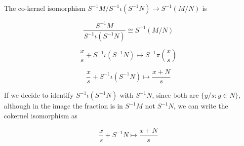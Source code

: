 \documentclass{article}
\begin{document}
The co-kernel isomorphism $S^{-1}M/S^{-1}\iota(S^{-1}N) \rightarrow S^{-1}(M/N)$ is

\[
\frac{S^{-1}M}{S^{-1}\iota(S^{-1}N)} \cong S^{-1}(M/N)
\]

\[
\frac{x}{s} + S^{-1}\iota(S^{-1}N) \mapsto S^{-1}\pi(\frac{x}{s})
\]

\[
\frac{x}{s} + S^{-1}\iota(S^{-1}N) \mapsto \frac{x + N}{s}
\]

If we decide to identify $S^{-1}\iota(S^{-1}N)$ with $S^{-1}N$, since both are $\{ y/s: y \in N \}$, although in the image the fraction is in $S^{-1}M$ not $S^{-1}N$, we can write the cokernel isomorphism as

\[
\frac{x}{s} + S^{-1}N \mapsto \frac{x + N}{s}
\]
\end{document}
